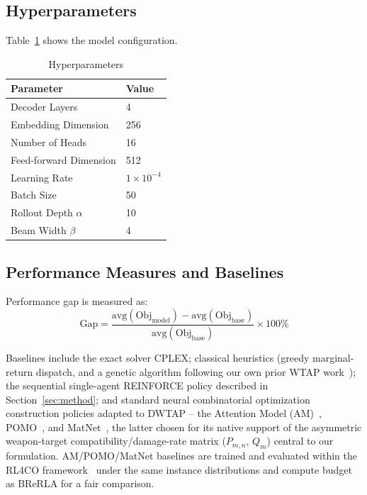 \documentclass{ieeeaccess}
\begin{document}
\subsection{Hyperparameters}

Table~\ref{tab:hyperparameters} shows the model configuration.

\begin{table}[htbp]
\centering
\small
\caption{Hyperparameters}
\label{tab:hyperparameters}
\begin{tabular}{ll}
\hline
\textbf{Parameter} & \textbf{Value} \\ \hline
Decoder Layers & 4 \\
Embedding Dimension & 256 \\
Number of Heads & 16 \\
Feed-forward Dimension & 512 \\
Learning Rate & $1 \times 10^{-4}$ \\
Batch Size & 50 \\
Rollout Depth $\alpha$ & 10 \\
Beam Width $\beta$ & 4 \\ \hline
\end{tabular}
\end{table}

\subsection{Performance Measures and Baselines}

Performance gap is measured as:
\begin{equation}
\text{Gap} = \frac{\text{avg}(\text{Obj}_{\text{model}}) - \text{avg}(\text{Obj}_{\text{base}})}{\text{avg}(\text{Obj}_{\text{base}})} \times 100\%
\end{equation}

Baselines include the exact solver CPLEX; classical heuristics (greedy marginal-return dispatch, and a genetic algorithm following our own prior WTAP work~\cite{lee2003genetic}); the sequential single-agent REINFORCE policy described in Section~\ref{sec:method}; and standard neural combinatorial optimization construction policies adapted to DWTAP -- the Attention Model (AM)~\cite{kool2018attention}, POMO~\cite{kwon2020pomo}, and MatNet~\cite{kwon2021matrix}, the latter chosen for its native support of the asymmetric weapon-target compatibility/damage-rate matrix ($P_{m,n}$, $Q_m$) central to our formulation. AM/POMO/MatNet baselines are trained and evaluated within the RL4CO framework~\cite{berto2023rl4co} under the same instance distributions and compute budget as BReRLA for a fair comparison.
\end{document}

